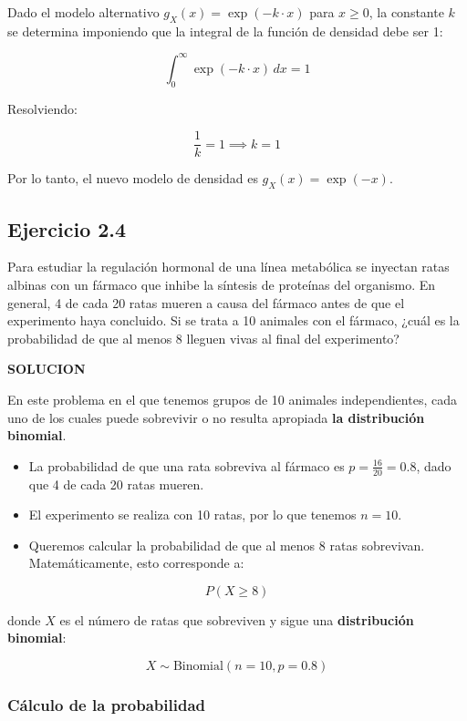 \documentclass[
]{article}
\begin{document}
Dado el modelo alternativo \(g_X(x) = \exp(-k \cdot x)\) para \(x \geq 0\), la constante \(k\) se determina imponiendo que la integral de la función de densidad debe ser 1:

\[
\int_0^\infty \exp(-k \cdot x) \, dx = 1
\]

Resolviendo:

\[
\frac{1}{k} = 1 \implies k = 1
\]

Por lo tanto, el nuevo modelo de densidad es \(g_X(x) = \exp(-x)\).

\subsection{Ejercicio 2.4}\label{ejercicio-2.4}

Para estudiar la regulación hormonal de una línea metabólica se inyectan ratas albinas con un fármaco que inhibe la síntesis de proteínas del organismo. En general, 4 de cada 20 ratas mueren a causa del fármaco antes de que el experimento haya concluido. Si se trata a 10 animales con el fármaco, ¿cuál es la probabilidad de que al menos 8 lleguen vivas al final del experimento?

\textbf{SOLUCION}

En este problema en el que tenemos grupos de 10 animales independientes, cada uno de los cuales puede sobrevivir o no resulta apropiada \textbf{la distribución binomial}.

\begin{itemize}
\item
  La probabilidad de que una rata sobreviva al fármaco es \(p = \frac{16}{20} = 0.8\), dado que 4 de cada 20 ratas mueren.
\item
  El experimento se realiza con 10 ratas, por lo que tenemos \(n = 10\).
\item
  Queremos calcular la probabilidad de que al menos 8 ratas sobrevivan. Matemáticamente, esto corresponde a:
\end{itemize}

\[
P(X \geq 8)
\]

donde \(X\) es el número de ratas que sobreviven y sigue una \textbf{distribución binomial}:

\[
X \sim \text{Binomial}(n=10, p=0.8)
\]

\subsubsection{Cálculo de la probabilidad}\label{cuxe1lculo-de-la-probabilidad}
\end{document}
